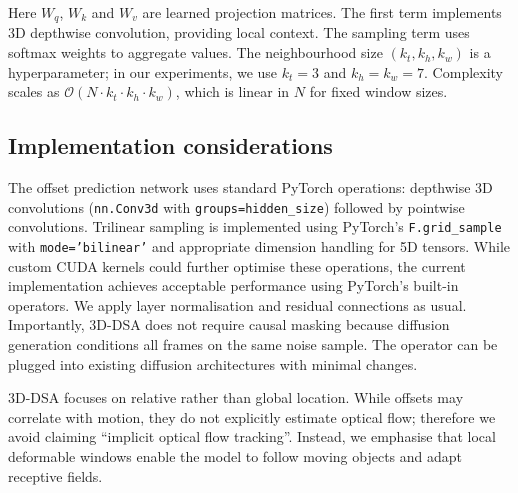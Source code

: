 \documentclass[11pt, letterpaper]{article}
\begin{document}
Here $W_q$, $W_k$ and $W_v$ are learned projection matrices. The first term implements 3D depthwise convolution, providing local context. The sampling term uses softmax weights to aggregate values. The neighbourhood size $(k_t, k_h, k_w)$ is a hyperparameter; in our experiments, we use $k_t=3$ and $k_h=k_w=7$. Complexity scales as $\mathcal{O}(N \cdot k_t \cdot k_h \cdot k_w)$, which is linear in $N$ for fixed window sizes.

\subsection{Implementation considerations}
The offset prediction network uses standard PyTorch operations: depthwise 3D convolutions (\texttt{nn.Conv3d} with \texttt{groups=hidden\_size}) followed by pointwise convolutions. Trilinear sampling is implemented using PyTorch's \texttt{F.grid\_sample} with \texttt{mode='bilinear'} and appropriate dimension handling for 5D tensors. While custom CUDA kernels could further optimise these operations, the current implementation achieves acceptable performance using PyTorch's built-in operators. We apply layer normalisation and residual connections as usual. Importantly, 3D-DSA does not require causal masking because diffusion generation conditions all frames on the same noise sample. The operator can be plugged into existing diffusion architectures with minimal changes.

3D-DSA focuses on relative rather than global location. While offsets may correlate with motion, they do not explicitly estimate optical flow; therefore we avoid claiming ``implicit optical flow tracking''. Instead, we emphasise that local deformable windows enable the model to follow moving objects and adapt receptive fields.
\end{document}
